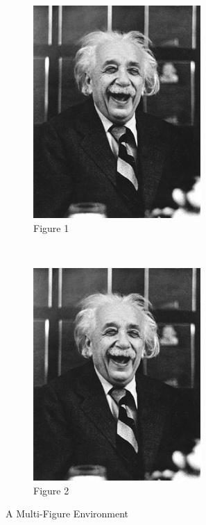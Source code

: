 \begin{figure}[ht]
	\centering
	\begin{subfigure}[t]{.6\textwidth}
		\centering
		\includegraphics[width=0.7\textwidth]{figures/sample/einstein.jpeg}
		\caption{Figure 1}
		\label{fig_multienv_1}
	\end{subfigure}
	~
	\begin{subfigure}[t]{0.7\textwidth}
		\centering
		\includegraphics[width=0.7\textwidth]{figures/sample/einstein.jpeg}
		\caption{Figure 2}
		\label{fig_multienv_2}
	\end{subfigure}
	
	\caption{A Multi-Figure Environment}
	\label{fig_multienv}
\end{figure}

